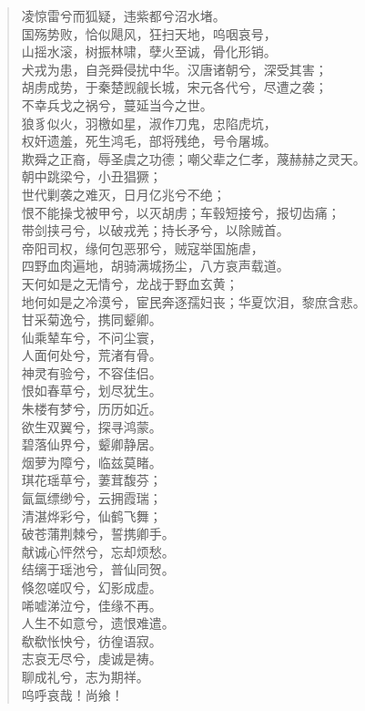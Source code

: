 \documentclass[12pt,oneside]{book}
\newenvironment{shici}{%
\begin{verse}%
\centering\large\hspace{12pt}}%
{\end{verse}}
\begin{document}
\begin{shici}
凌惊雷兮而狐疑，违紫都兮沼水堵。\\
国殇势败，恰似飓风，狂扫天地，呜咽哀号，\\
山摇水滚，树振林啸，孽火至诚，骨化形销。\\
犬戎为患，自尧舜侵扰中华。汉唐诸朝兮，深受其害；\\
胡虏成势，于秦楚觊觎长城，宋元各代兮，尽遭之袭；\\
不幸兵戈之祸兮，蔓延当今之世。\\
狼豸似火，羽檄如星，淑作刀鬼，忠陷虎坑，\\
权奸遗羞，死生鸿毛，部将残绝，号令屠城。\\
欺舜之正裔，辱圣虞之功德；嘲父辈之仁孝，蔑赫赫之灵天。\\
朝中跳梁兮，小丑猖獗；\\
世代剿袭之难灭，日月亿兆兮不绝；\\
恨不能操戈被甲兮，以灭胡虏；车毂短接兮，报切齿痛；\\
带剑挟弓兮，以破戎羌；持长矛兮，以除贼首。\\
帝阳司权，缘何包恶邪兮，贼寇举国施虐，\\
四野血肉遍地，胡骑满城扬尘，八方哀声载道。\\
天何如是之无情兮，龙战于野血玄黄；\\
地何如是之冷漠兮，宦民奔逐孺妇丧；华夏饮泪，黎庶含悲。\\
甘采菊逸兮，携同颦卿。\\
仙乘辇车兮，不问尘寰，\\
人面何处兮，荒渚有骨。\\
神灵有验兮，不容佳侣。\\
恨如春草兮，划尽犹生。\\
朱楼有梦兮，历历如近。\\
欲生双翼兮，探寻鸿蒙。\\
碧落仙界兮，颦卿静居。\\
烟萝为障兮，临兹莫睹。\\
琪花瑶草兮，萋茸馥芬；\\
氤氲缥缈兮，云拥霞瑞；\\
清湛烨彩兮，仙鹤飞舞；\\
破苍蒲荆棘兮，誓携卿手。\\
献诚心怦然兮，忘却烦愁。\\
结缡于瑶池兮，普仙同贺。\\
倏忽嗟叹兮，幻影成虚。\\
唏嘘涕泣兮，佳缘不再。\\
人生不如意兮，遗恨难遣。\\
欷欷怅怏兮，彷徨语寂。\\
志哀无尽兮，虔诚是祷。\\
聊成礼兮，志为期祥。\\
呜呼哀哉！尚飨！
\end{shici}
\end{document}
